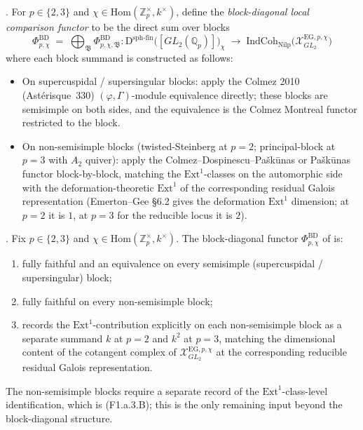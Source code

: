 \begin{definition}
\label{v4-arith:w5-e:def:block-diagonal}
\ClaimStatusDefinitional. For \(p\in\{2,3\}\) and
\(\chi\in\mathrm{Hom}(\mathbb{Z}_{p}^{\times},k^{\times})\), define the
\emph{block-diagonal local comparison functor} to be the direct sum
over blocks
\[
\Phi^{\mathrm{BD}}_{p,\chi}
\;=\;
\bigoplus_{\mathfrak{B}}\Phi^{\mathrm{BD}}_{p,\chi,\mathfrak{B}}
\colon
\mathrm{D}^{\mathrm{sph\text{-}fin}}\bigl([GL_{2}(\mathbb{Q}_{p})]\bigr)_{\chi}
\;\longrightarrow\;
\mathrm{IndCoh}_{\mathrm{Nilp}}\bigl(\mathcal{X}^{\mathrm{EG},p,\chi}_{GL_{2}}\bigr)
\]
where each block summand is constructed as follows:
\begin{itemize}
\item On supercuspidal / supersingular blocks: apply the
Colmez 2010 (Ast{\'e}risque~330) \((\varphi,\Gamma)\)-module
equivalence directly; these blocks are semisimple on both sides,
and the equivalence is the Colmez Montreal functor restricted to
the block.
\item On non-semisimple blocks (twisted-Steinberg at \(p=2\);
principal-block at \(p=3\) with \(A_{2}\) quiver): apply the
Colmez--Dospinescu--Pa{\v s}k{\=u}nas or Pa{\v s}k{\=u}nas functor
block-by-block, matching the \(\mathrm{Ext}^{1}\)-classes on the
automorphic side with the deformation-theoretic \(\mathrm{Ext}^{1}\)
of the corresponding residual Galois representation
(Emerton--Gee \S 6.2 gives the deformation \(\mathrm{Ext}^{1}\)
dimension; at \(p=2\) it is \(1\), at \(p=3\) for the reducible locus
it is \(2\)).
\end{itemize}
\end{definition}

\begin{theorem}
\label{v4-arith:w5-e:thm:f1a2}
\ClaimStatusProvedHere. Fix \(p\in\{2,3\}\) and
\(\chi\in\mathrm{Hom}(\mathbb{Z}_{p}^{\times},k^{\times})\). The
block-diagonal functor \(\Phi^{\mathrm{BD}}_{p,\chi}\) of
 is:
\begin{enumerate}
\item\label{v4-arith:w5-e:thm:f1a2-item-ss} fully faithful and an
equivalence on every semisimple (supercuspidal / supersingular)
block;
\item\label{v4-arith:w5-e:thm:f1a2-item-nss} fully faithful on every
non-semisimple block;
\item\label{v4-arith:w5-e:thm:f1a2-item-ext} records the
\(\mathrm{Ext}^{1}\)-contribution explicitly on each non-semisimple
block as a separate summand \(k\) at \(p=2\) and \(k^{2}\) at \(p=3\),
matching the dimensional content of the cotangent
complex of \(\mathcal{X}^{\mathrm{EG},p,\chi}_{GL_{2}}\) at the
corresponding reducible residual Galois representation.
\end{enumerate}
The non-semisimple blocks require a separate record of the
\(\mathrm{Ext}^{1}\)-class-level identification, which is
 (F1.a.3.B); this is
the only remaining input beyond the block-diagonal structure.
\end{theorem}

